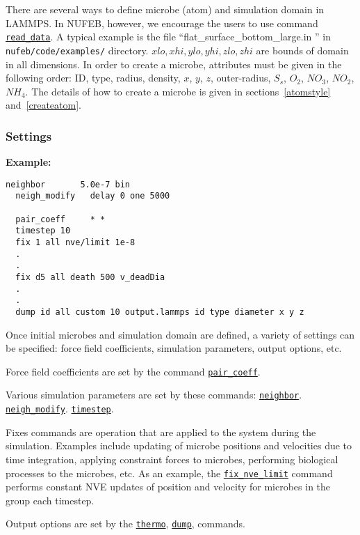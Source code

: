 \documentclass[11pt,a4paper,openright]{article}
\begin{document}
There are several ways to define microbe (atom) and simulation domain in LAMMPS. In NUFEB, however, we encourage the users
to use command 
\href{http://lammps.sandia.gov/doc/read_data.html}{\tt read\_data}.
A typical example is the file ``flat\_surface\_bottom\_large.in ''
in {\tt nufeb/code/examples/} directory.
$xlo,xhi,ylo,yhi,zlo,zhi$ are bounds of domain in all dimensions.
In order to create a microbe, attributes must be given in the following order: ID, type, radius, density, $x$, $y$, $z$, outer-radius, $S_s$, $O_2$, $NO_3$, $NO_2$, $NH_4$.
The details of how to create a microbe is given in sections~\ref{atomstyle} and~\ref{createatom}.

\subsubsection{Settings}
\textbf{Example:}
\begin{Verbatim}[frame=single]
  neighbor       5.0e-7 bin
  neigh_modify   delay 0 one 5000
  
  pair_coeff     * *
  timestep 10
  fix 1 all nve/limit 1e-8 
  .
  .
  fix d5 all death 500 v_deadDia
  .
  .
  dump id all custom 10 output.lammps id type diameter x y z
\end{Verbatim}

Once initial microbes and simulation domain are defined, a variety of settings can be specified: force field coefficients, simulation parameters, output options, etc.

Force field coefficients are set by the command
\href{http://lammps.sandia.gov/doc/pair_coeff.html}{\tt pair\_coeff}.

Various simulation parameters are set by these commands:
\href{http://lammps.sandia.gov/doc/neighbor.html}{\tt neighbor}.
\href{http://lammps.sandia.gov/doc/neigh_modify.html}{\tt neigh\_modify}.
\href{http://lammps.sandia.gov/doc/timestep.html}{\tt timestep}.

Fixes commands are operation that are applied to the system during the simulation.
Examples include updating of microbe positions and velocities due to time integration,
applying constraint forces to microbes, performing biological processes to the microbes, etc.
As an example, the 
\href{http://lammps.sandia.gov/doc/fix_nve_limit.html}{\tt fix\_nve\_limit} command performs constant NVE updates of position and velocity for microbes in the group each timestep.

Output options are set by the 
\href{http://lammps.sandia.gov/doc/thermo.html}{\tt thermo},
\href{http://lammps.sandia.gov/doc/dump.html}{\tt dump},
commands.
\end{document}
